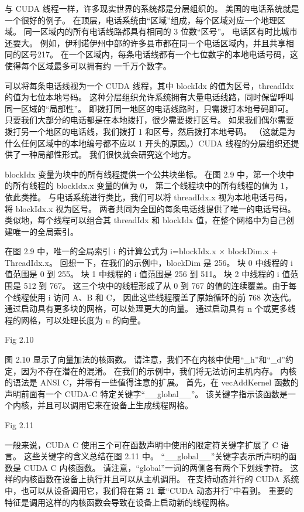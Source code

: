 \begin{remark}[层级组织]
与 CUDA 线程一样，许多现实世界的系统都是分层组织的。 美国的电话系统就是一个很好的例子。 
在顶层，电话系统由“区域”组成，每个区域对应一个地理区域。 同一区域内的所有电话线路都具有相同的 3 位数“区号”。 
电话区有时比城市还要大。 例如，伊利诺伊州中部的许多县市都在同一个电话区域内，并且共享相同的区号217。
在一个区域内，每条电话线都有一个七位数字的本地电话号码，这使得每个区域最多可以拥有约 一千万个数字。

可以将每条电话线视为一个 CUDA 线程，其中 blockIdx 的值为区号，threadIdx 的值为七位本地号码。 
这种分层组织允许系统拥有大量电话线路，同时保留呼叫同一区域的“局部性”。 
即拨打同一地区的电话线路时，只需拨打本地号码即可。 只要我们大部分的电话都是在本地拨打，很少需要拨打区号。 
如果我们偶尔需要拨打另一个地区的电话线，我们拨打 1 和区号，然后拨打本地号码。 
（这就是为什么任何区域中的本地编号都不应以 1 开头的原因。）CUDA 线程的分层组织还提供了一种局部性形式。 
我们很快就会研究这个地方。
\end{remark}

blockIdx 变量为块中的所有线程提供一个公共块坐标。 在图 2.9 中，第一个块中的所有线程的 blockIdx.x 变量的值为 0，
第二个线程块中的所有线程的值为 1，依此类推。 与电话系统进行类比，我们可以将 threadIdx.x 视为本地电话号码，
将 blockIdx.x 视为区号。 两者共同为全国的每条电话线提供了唯一的电话号码。 
类似地，每个线程可以组合其 threadIdx 和 blockIdx 值，在整个网格中为自己创建唯一的全局索引。

在图 2.9 中，唯一的全局索引 i 的计算公式为 i=blockIdx.x × blockDim.x + ThreadIdx.x。 
回想一下，在我们的示例中，blockDim 是 256。 块 0 中线程的 i 值范围是 0 到 255。 
块 1 中线程的 i 值范围是 256 到 511。 块 2 中线程的 i 值范围是 512 到 767。 
这三个块中的线程形成了从 0 到 767 的值的连续覆盖。由于每个线程使用 i 访问 A、B 和 C，
因此这些线程覆盖了原始循环的前 768 次迭代。 通过启动具有更多块的网格，可以处理更大的向量。 
通过启动具有 n 个或更多线程的网格，可以处理长度为 n 的向量。

{\color{red} Fig 2.10}

图 2.10 显示了向量加法的核函数。 请注意，我们不在内核中使用“\_h”和“\_d”约定，因为不存在潜在的混淆。 
在我们的示例中，我们将无法访问主机内存。 内核的语法是 ANSI C，并带有一些值得注意的扩展。 
首先，在 vecAddKernel 函数的声明前面有一个 CUDA-C 特定关键字“\_\_global\_\_”。 
该关键字指示该函数是一个内核，并且可以调用它来在设备上生成线程网格。

{\color{red} Fig 2.11}

一般来说，CUDA C 使用三个可在函数声明中使用的限定符关键字扩展了 C 语言。 
这些关键字的含义总结在图 2.11 中。 “\_\_global\_\_”关键字表示所声明的函数是 CUDA C 内核函数。 
请注意，“global”一词的两侧各有两个下划线字符。 这样的内核函数在设备上执行并且可以从主机调用。 
在支持动态并行的 CUDA 系统中，也可以从设备调用它，我们将在第 21 章“CUDA 动态并行”中看到。 
重要的特征是调用这样的内核函数会导致在设备上启动新的线程网格。

